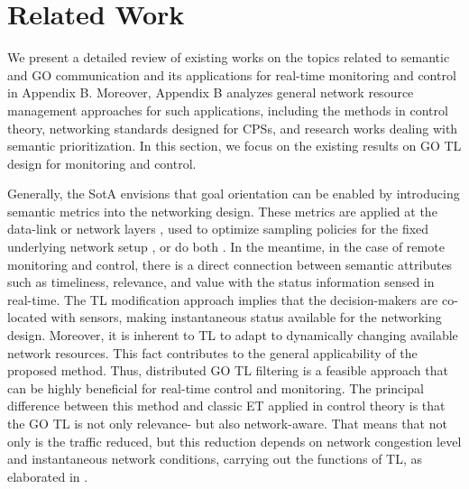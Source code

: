 \section{Related Work}
\label{sec:related_work}
We present a detailed review of existing works on the topics related to semantic and GO communication and its applications for real-time monitoring and control in Appendix B. Moreover, Appendix B analyzes general network resource management approaches for such applications, including the methods in control theory, networking standards designed for CPSs, and research works dealing with semantic prioritization. In this section, we focus on the existing results on GO TL design for monitoring and control.


Generally, the SotA envisions that goal orientation can be enabled by introducing semantic metrics into the networking design. These metrics are applied at the data-link or network layers \cite{ouguz2022implementation, kadota2018scheduling, chang2023lightweight, ma2022scheduling, ayan2019age}, used to optimize sampling policies for the fixed underlying network setup \cite{maatouk2020age, nikkhah2023age, mason2023multi}, or do both \cite{zheng2020urgency, peng2021sensing, jarwan2021information }. In the meantime, in the case of remote monitoring and control, there is a direct connection between semantic attributes such as timeliness, relevance, and value with the status information sensed in real-time. The TL modification approach implies that the decision-makers are co-located with sensors, making instantaneous status available for the networking design. Moreover, it is inherent to TL to adapt to dynamically changing available network resources. This fact contributes to the general applicability of the proposed method. Thus, distributed GO TL filtering is a feasible approach that can be highly beneficial for real-time control and monitoring.  The principal difference between this method and classic ET applied in control theory is that the GO TL is not only relevance- but also network-aware. That means that not only is the traffic reduced, but this reduction depends on network congestion level and instantaneous network conditions, carrying out the functions of TL, as elaborated in \cite{ge2019distributed}. 
 
